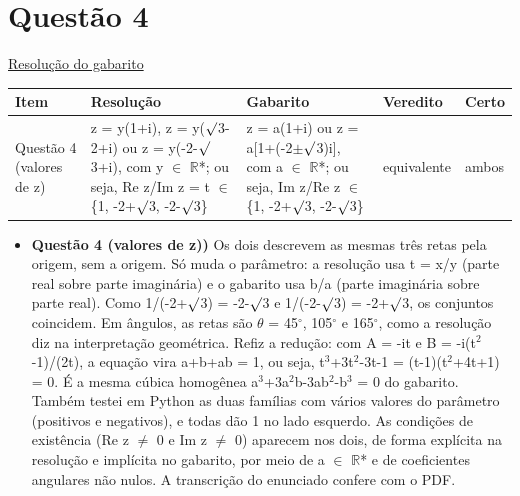 \documentclass{article}%
\begin{document}
\section*{Questão 4}%
\href{https://poliedroresolve.sistemapoliedro.com.br/vestibulares/ime/2026/ime-2-fase-dia-1-23-10-2025-2-fase-dia-1/dissertativa-4-matematica-2-fase-dia-1-ime-2026}{Resolução do gabarito}\par\smallskip%
\begin{longtable}{@{}p{} p{} p{} p{} p{}@{}}\toprule Item & Resolução & Gabarito & Veredito & Certo \\ \midrule
Questão 4 (valores de z) & z = y(1+i), z = y($\surd$3-2+i) ou z = y(-2-$\surd$3+i), com y $\in$ $\mathbb{R}$*; ou seja, Re z/Im z = t $\in$ \{1, -2+$\surd$3, -2-$\surd$3\} & z = a(1+i) ou z = a{[}1+(-2$\pm$$\surd$3)i{]}, com a $\in$ $\mathbb{R}$*; ou seja, Im z/Re z $\in$ \{1, -2+$\surd$3, -2-$\surd$3\} & equivalente & ambos \\
\bottomrule\end{longtable}%
\begin{itemize}%
\item%
\textbf{Questão 4 (valores de z))} Os dois descrevem as mesmas três retas pela origem, sem a origem. Só muda o parâmetro: a resolução usa t = x/y (parte real sobre parte imaginária) e o gabarito usa b/a (parte imaginária sobre parte real). Como 1/(-2+$\surd$3) = -2-$\surd$3 e 1/(-2-$\surd$3) = -2+$\surd$3, os conjuntos coincidem. Em ângulos, as retas são $\theta$ = 45$^\circ$, 105$^\circ$ e 165$^\circ$, como a resolução diz na interpretação geométrica. Refiz a redução: com A = -it e B = -i(t$^2$-1)/(2t), a equação vira a+b+ab = 1, ou seja, t$^3$+3t$^2$-3t-1 = (t-1)(t$^2$+4t+1) = 0. É a mesma cúbica homogênea a$^3$+3a$^2$b-3ab$^2$-b$^3$ = 0 do gabarito. Também testei em Python as duas famílias com vários valores do parâmetro (positivos e negativos), e todas dão 1 no lado esquerdo. As condições de existência (Re z $\neq$ 0 e Im z $\neq$ 0) aparecem nos dois, de forma explícita na resolução e implícita no gabarito, por meio de a $\in$ $\mathbb{R}$* e de coeficientes angulares não nulos. A transcrição do enunciado confere com o PDF.%
\end{itemize}%
\end{document}
